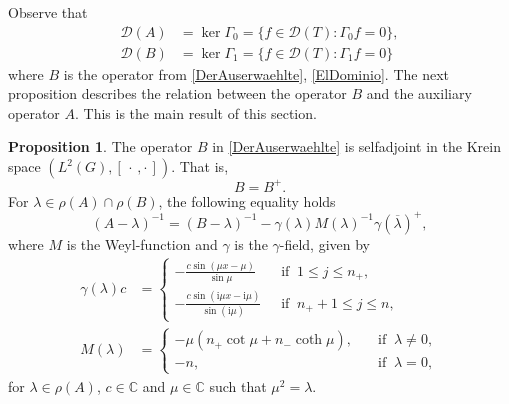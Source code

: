 \documentclass{article}
\numberwithin{equation}{section}
\theoremstyle{definition}
\newtheorem{proposition}[theorem]{Proposition}
\newcommand{\kip}{[\,\cdot\, , \cdot\,]}
\newcommand{\C}{\mathbb{C}}
\newcommand{\mD}{\mathcal{D}}
\newcommand{\I}{\mathrm i} %
\newcommand{\AK}{A}
\newcommand{\AKone}{B}
\newcommand{\TK}{T}
\newcommand{\MK}{M}
\newcommand{\gammaK}{\gamma}
\begin{document}
Observe that 
\begin{align}
   \mD(\AK) &= \ker \Gamma_0 = \{ f\in \mD(\TK) : \Gamma_0 f = 0 \},
   \\
   \mD(\AKone) &= \ker \Gamma_1 = \{ f\in \mD(\TK) : \Gamma_1 f = 0 \}
\end{align}
where $B$ is the operator from \eqref{DerAuserwaehlte}, \eqref{ElDominio}.
The next proposition describes the relation between the operator $B$ and the auxiliary operator $A$. 
This is the main result of this section.
\begin{proposition}
   The operator $B$ in \eqref{DerAuserwaehlte} is selfadjoint in the Krein space $(L^2(G), \kip)$. 
   That is,
   \begin{equation*}
      B=B^+.
   \end{equation*}
	For $\lambda\in\rho(A)\cap\rho(B)$, the following equality holds
    \begin{equation}
    \label{KREIN}
    	(A - \lambda)^{-1} = (B - \lambda)^{-1} - \gamma(\lambda)M(\lambda)^{-1}\gamma(\overline \lambda)^+,
    \end{equation}
    where $M$ is the Weyl-function and $\gamma$ is the $\gamma$-field, given by
    \begin{align}
    \label{eq:gammafield}
        \gammaK(\lambda)c &= 
   	\begin{cases}
   		- \frac{c \sin(\mu x - \mu)}{\sin\mu}\quad &\text{if }\ 1 \le j \le n_+,\\[1ex]
   		- \frac{c \sin(\I\mu x - \I\mu)}{\sin(\I\mu)} &\text{if }\ n_+ + 1 \le j \le n,
   	\end{cases}
    \\[1ex]
    \label{eq:Weylfunction}
    	\MK(\lambda) &= 
    	\begin{cases}
    		-\mu ( n_+\cot\mu + n_-\coth \mu ), \quad & \text{if }\ \lambda \neq 0,\\
    		- n,\quad & \text{if }\ \lambda = 0,
    	\end{cases}
    \end{align}
    for $\lambda\in\rho(\AK)$, $c\in \mathbb C$ and $\mu\in\C$ such that $\mu^2 = \lambda$.
\end{proposition}
\end{document}
